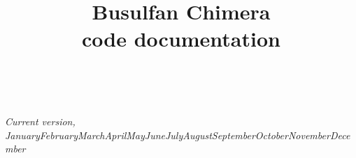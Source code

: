 \documentclass{tufte-book} %
\title{Busulfan Chimera\\code documentation} %
\newcommand{\monthyear}{\ifcase\month\or January\or February\or March\or April\or May\or June\or July\or August\or September\or October\or November\or December\fi\space\number\year} %
\newcommand{\openepigraph}[2]{ %
\begin{fullwidth}
\sffamily\large
\begin{doublespace}
\noindent\allcaps{#1}\\ %
\noindent\allcaps{#2} %
\end{doublespace}
\end{fullwidth}
}
\begin{document}




\maketitle %


\newpage
\begin{fullwidth}
~\vfill
\thispagestyle{empty}
\setlength{\parindent}{0pt}
\setlength{\parskip}{\baselineskip}




\par\textit{Current version, \monthyear}
\end{fullwidth}


\tableofcontents %





\end{document}
